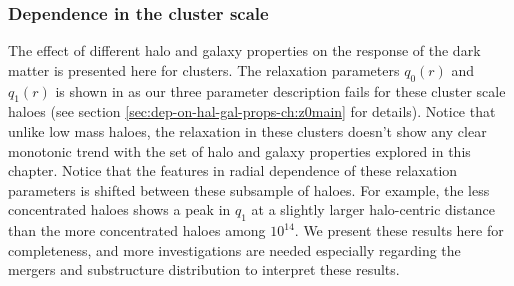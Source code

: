 \subsubsection*{Dependence in the cluster scale}
\label{sec:depend_hal_gal_props_cluster}
The effect of different halo and galaxy properties on the response of the dark matter is presented here for clusters. The relaxation parameters $q_0(r)$ and $q_1(r)$ is shown in  as our three parameter description fails for these cluster scale haloes (see section \ref{sec:dep-on-hal-gal-props-ch:z0main} for details). Notice that unlike low mass haloes, the relaxation in these clusters doesn't show any clear monotonic trend with the set of halo and galaxy properties explored in this chapter. Notice that the features in radial dependence of these relaxation parameters is shifted between these subsample of haloes. For example, the less concentrated haloes shows a peak in $q_{1}$ at a slightly larger halo-centric distance than the more concentrated haloes among $10^{14}$. We present these results here for completeness, and more investigations are needed especially regarding the mergers and substructure distribution to interpret these results.  

